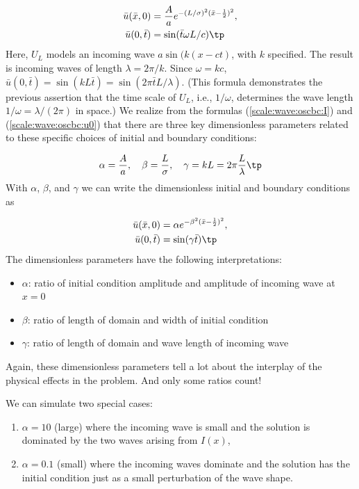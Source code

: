 \documentclass[graybox,envcountchap,sectrefs,final]{svmonodo}
\begin{document}
\begin{align}
\bar u(\bar x,0) &= \frac{A}{a}e^{-(L/\sigma)^2(\bar x -\frac{1}{2})^2},
\label{scale:wave:oscbc:I}\\ 
\bar u(0,\bar t) &= \sin(\bar t\omega L/c)\tp
\label{scale:wave:oscbc:u0}
\end{align}
Here, $U_L$ models an incoming wave $a\sin(k(x-ct)$, with $k$ specified.
The result is incoming
waves of length $\lambda = 2\pi/k$. Since $\omega =kc$,
$\bar u(0,\bar t)=\sin(kL\bar t) = \sin(2\pi\bar t L/\lambda)$.
(This formula demonstrates the previous assertion that the time scale
of $U_L$, i.e., $1/\omega$, determines the wave length $1/\omega = \lambda/(2\pi)$ in space.)
We realize from the formulas (\ref{scale:wave:oscbc:I}) and
(\ref{scale:wave:oscbc:u0})
that there are three key dimensionless parameters related
to these specific choices of initial and boundary conditions:

\[ \alpha = \frac{A}{a},\quad\beta = \frac{L}{\sigma},\quad\gamma = kL
=2\pi\frac{L}{\lambda}\tp\]
With $\alpha$, $\beta$, and $\gamma$ we can write the dimensionless
initial and boundary conditions as

\begin{align*}
\bar u(\bar x,0) &= \alpha e^{-\beta^2(\bar x -\frac{1}{2})^2},\\ 
\bar u(0,\bar t) &= \sin(\gamma\bar t)\tp
\end{align*}
The dimensionless parameters have the following interpretations:

\begin{itemize}
 \item $\alpha$: ratio of initial condition amplitude and amplitude of incoming wave
   at $x=0$

 \item $\beta$: ratio of length of domain and width of initial condition

 \item $\gamma$: ratio of length of domain and wave length of incoming wave
\end{itemize}

\noindent
Again, these dimensionless parameters tell a lot about the interplay of
the physical effects in the problem. And only some ratios count!

We can simulate two special cases:

\begin{enumerate}
\item $\alpha=10$ (large) where the
   incoming wave is small and the solution is dominated by the two waves
   arising from $I(x)$,

\item $\alpha=0.1$ (small) where the incoming waves
   dominate and the solution has the initial condition just
   as a small perturbation of the wave shape.
\end{enumerate}
\end{document}
